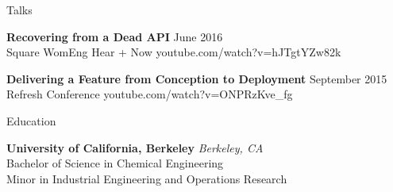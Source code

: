 \documentclass{resume} %
\begin{document}


\begin{rSection}{Talks}

{\bf Recovering from a Dead API} \hfill {June 2016} \\
{Square WomEng Hear + Now}  \hfill {youtube.com/watch?v=hJTgtYZw82k}

{\bf Delivering a Feature from Conception to Deployment} \hfill {September 2015} \\
{Refresh Conference}  \hfill {youtube.com/watch?v=ONPRzKve\_fg}

\end{rSection}


\begin{rSection}{Education}

{\bf University of California, Berkeley} \hfill {\em Berkeley, CA} \\
Bachelor of Science in Chemical Engineering \\
Minor in Industrial Engineering and Operations Research \\




\end{rSection}






\end{document}
